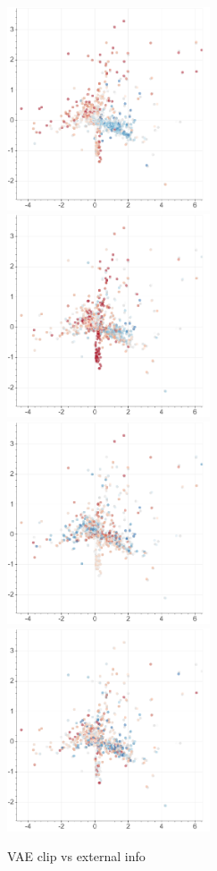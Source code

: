 \begin{figure}
    \centering
    \includegraphics[height=6cm]{img/6_T_Hunch/ls_beta_clip_tcentro.png}
    \includegraphics[height=6cm]{img/6_T_Hunch/ls_beta_clip_Ip.png}
    \includegraphics[height=6cm]{img/6_T_Hunch/ls_beta_clip_F.png}
    \includegraphics[height=6cm]{img/6_T_Hunch/ls_beta_clip_NS.png}
    \caption{VAE clip vs external info}
    \label{fig:my_label}
\end{figure}

